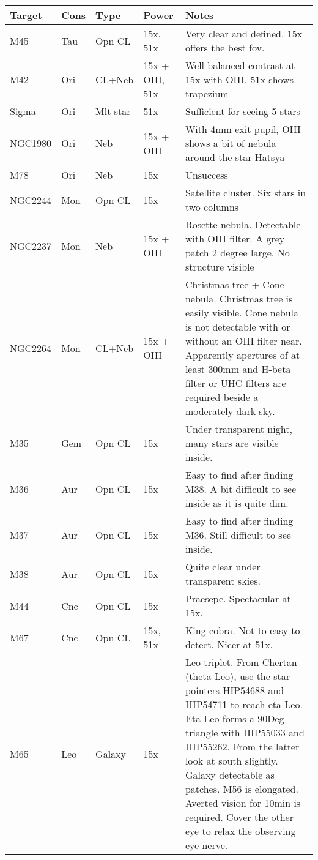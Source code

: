 \begin{longtable}{ p{0.7in}  p{0.3in}  p{0.6in}  p{0.9in}  p{5.8in} }
\hline 
{\bf Target} & {\bf Cons} & {\bf Type} & {\bf Power} & {\bf Notes} \\ 
\hline 
M45 & Tau & Opn CL & 15x, 51x & Very clear and defined. 15x offers the best fov. \\ 
M42 & Ori & CL+Neb & 15x + OIII, 51x & Well balanced contrast at 15x with OIII. 51x shows trapezium \\ 
Sigma & Ori & Mlt star & 51x & Sufficient for seeing 5 stars \\ 
NGC1980 & Ori & Neb & 15x + OIII & With 4mm exit pupil, OIII shows a bit of nebula around the star Hatsya \\ 
M78 & Ori & Neb & 15x & Unsuccess \\ 
NGC2244 & Mon & Opn CL & 15x & Satellite cluster. Six stars in two columns  \\ 
NGC2237 & Mon & Neb & 15x + OIII & Rosette nebula. Detectable with OIII filter. A grey patch 2 degree large. No structure visible \\ 
NGC2264 & Mon & CL+Neb & 15x + OIII & Christmas tree + Cone nebula. Christmas tree is easily visible. Cone nebula is not detectable with or without an OIII filter near. Apparently apertures of at least 300mm and H-beta filter or UHC filters are required beside a moderately dark sky. \\ 
M35 & Gem & Opn CL & 15x & Under transparent night, many stars are visible inside. \\ 
M36 & Aur & Opn CL & 15x & Easy to find after finding M38. A bit difficult to see inside as it is quite dim. \\ 
M37 & Aur & Opn CL & 15x & Easy to find after finding M36. Still difficult to see inside. \\ 
M38 & Aur & Opn CL & 15x & Quite clear under transparent skies. \\ 
M44 & Cnc & Opn CL & 15x & Praesepe. Spectacular at 15x. \\ 
M67 & Cnc & Opn CL & 15x, 51x & King cobra. Not to easy to detect. Nicer at 51x. \\ 
M65 & Leo & Galaxy & 15x & Leo triplet. From Chertan (theta Leo), use the star pointers HIP54688 and HIP54711 to reach eta Leo. Eta Leo forms a 90Deg triangle with HIP55033 and HIP55262. From the latter look at south slightly. Galaxy detectable as patches. M56 is elongated. Averted vision for 10min is required. Cover the other eye to relax the observing eye nerve. \\ 

\end{longtable}
